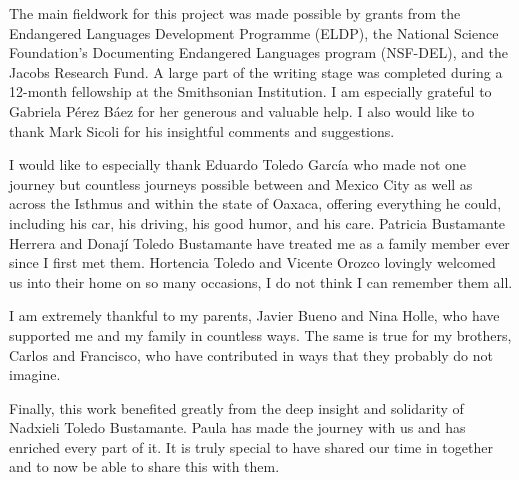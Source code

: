\begin{refsection}

The main fieldwork for this project was made possible by grants from the Endangered Languages Development Programme (ELDP), the National Science Foundation's Documenting Endangered Languages program (NSF-DEL), and the Jacobs Research Fund. A large part of the writing stage was completed during a 12-month fellowship at the Smithsonian Institution. I am especially grateful to Gabriela P\'{e}rez B\'{a}ez for her generous and valuable help. I also would like to thank Mark Sicoli for his insightful comments and suggestions.


I would like to especially thank Eduardo Toledo Garc\'{i}a who made not one journey but countless journeys possible between  and Mexico City as well as across the Isthmus and within the state of Oaxaca, offering everything he could, including his car, his driving, his good humor, and his care. Patricia Bustamante Herrera and Donaj\'{i} Toledo Bustamante have treated me as a family member ever since I first met them. Hortencia Toledo and Vicente Orozco lovingly welcomed us into their home on so many occasions, I do not think I can remember them all. 

I am extremely thankful to my parents, Javier Bueno and Nina Holle, who have supported me and my family in countless ways. The same is true for my brothers, Carlos and Francisco, who have contributed in ways that they probably do not imagine. 

Finally, this work benefited greatly from the deep insight and solidarity of Nadxieli Toledo Bustamante. Paula has made the journey with us and has enriched every part of it. It is truly special to have shared our time in  together and to now be able to share this with them.

\printbibliography[heading=subbibliography]
\end{refsection}

